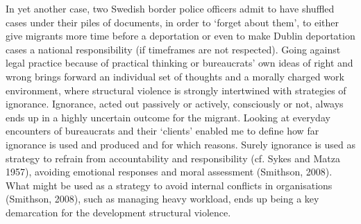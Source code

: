 \par
In yet another case, two Swedish border police officers admit to have shuffled cases under their piles of documents, in order to ‘forget about them’, to either give migrants more time before a deportation or even to make Dublin deportation cases a national responsibility (if timeframes are not respected). Going against legal practice because of practical thinking or bureaucrats’ own ideas of right and wrong brings forward an individual set of thoughts and a morally charged work environment, where structural violence is strongly intertwined with strategies of ignorance. Ignorance, acted out passively or actively, consciously or not, always ends up in a highly uncertain outcome for the migrant. Looking at everyday encounters of bureaucrats and their ‘clients’ enabled me to define how far ignorance is used and produced and for which reasons. Surely ignorance is used as strategy to refrain from accountability and responsibility (cf. Sykes and Matza 1957), avoiding emotional responses and moral assessment (Smithson, 2008). What might be used as a strategy to avoid internal conflicts in organisations (Smithson, 2008), such as managing heavy workload, ends up being a key demarcation for the development structural violence.

